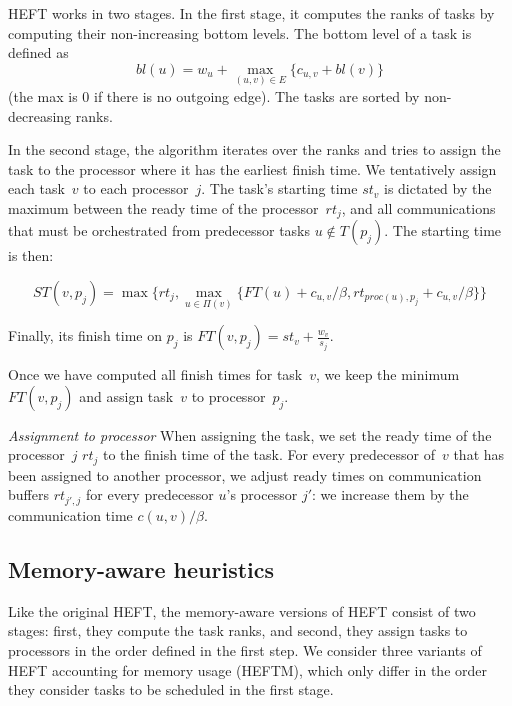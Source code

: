 \documentclass[conference]{IEEEtran}
\begin{document}
    HEFT works in two stages.
    In the first stage, it computes the ranks of tasks by computing their non-increasing bottom levels.
    The bottom level of a task is defined as
    $$bl(u) = w_u + \max_{(u,v)\in E} \{c_{u,v} + bl(v)\}$$
    (the max is 0 if there is no outgoing edge).
    The tasks are sorted by non-decreasing ranks.

    In the second stage, the algorithm iterates over the ranks and tries to assign the task to the processor where it
    has the earliest finish time.
    We tentatively assign each task~$v$ to each processor~$j$.
    The task's starting time $st_v$ is dictated by the maximum between the ready time of the processor~$rt_j$,
    and all communications that
    must be orchestrated from predecessor tasks $u\notin T(p_j)$.
    The starting time is then:

 {\footnotesize{   \[ST(v, p_j) = \max{ \{rt_j, \max_{ u \in \Pi(v)}\{ FT(u)+ c_{u,v} / \beta , rt_{proc(u), p_j} + c_{u,v} / \beta  \} \} } \]}}

    Finally, its finish time on $p_j$ is
    $FT(v,p_j) = st_v + \frac{w_v}{s_j}$.

    Once we have computed all finish times for task~$v$,
    we keep the minimum $FT(v,p_j)$ and assign task~$v$
    to processor~$p_j$.

    \textit{Assignment to processor}
    When assigning the task, we set the ready time of the processor~$j$ $rt_j$ to the finish time of the task.
    For every predecessor of~$v$ that has been assigned to another processor, we adjust ready times on
    communication buffers $rt_{j', j}$ for every predecessor $u$'s processor $j'$: we increase them by the
    communication time $c( u,v) / \beta$.

    \subsection{Memory-aware heuristics}
    \label{sec.heftm}
    Like the original HEFT, the memory-aware versions of HEFT consist of two stages:
    first, they compute the task ranks,
    and second, they assign tasks to processors in the order defined in the first step.
    We consider three variants of HEFT accounting for memory usage (HEFTM), which only
    differ in the order they consider tasks to be scheduled in the first stage.

\smallskip
\end{document}
